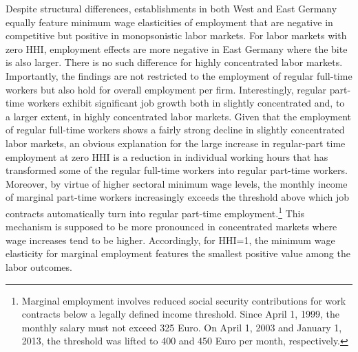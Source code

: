 \documentclass[11pt,oneside,reqno,xcolor=dvipsnames]{article} %
\begin{document}
Despite structural differences, establishments in both West and East Germany equally feature minimum wage elasticities of employment that are negative in competitive but positive in monopsonistic labor markets. For labor markets with zero HHI, employment effects are more negative in East Germany where the bite is also larger. There is no such difference for highly concentrated labor markets. Importantly, the findings are not restricted to the employment of regular full-time workers but also hold for overall employment per firm. Interestingly, regular part-time workers exhibit significant job growth both in slightly concentrated and, to a larger extent, in highly concentrated labor markets. Given that the employment of regular full-time workers shows a fairly strong decline in slightly concentrated labor markets, an obvious explanation for the large increase in regular-part time employment at zero HHI is a reduction in individual working hours that has transformed some of the regular full-time workers into regular part-time workers. Moreover, by virtue of higher sectoral minimum wage levels, the monthly income of marginal part-time workers increasingly exceeds the threshold above which job contracts automatically turn into regular part-time employment.\footnote{Marginal employment involves reduced social security contributions for work contracts below a legally defined income threshold. Since April 1, 1999, the monthly salary must not exceed 325 Euro. On April 1, 2003 and January 1, 2013, the threshold was lifted to 400 and 450 Euro per month, respectively.} This mechanism is supposed to be more pronounced in concentrated markets where wage increases tend to be higher. Accordingly, for HHI=1, the minimum wage elasticity for marginal employment features the smallest positive value among the labor outcomes.
\end{document}
